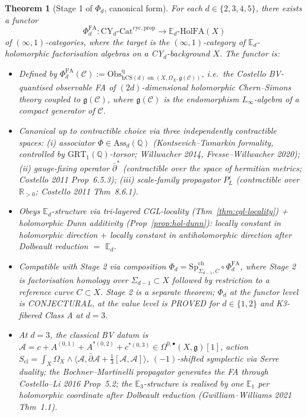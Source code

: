 \documentclass[11pt]{article}
\newtheorem{theorem}{Theorem}
\theoremstyle{definition}
\providecommand{\RR}{\mathbb{R}}
\providecommand{\QQ}{\mathbb{Q}}
\providecommand{\fg}{\mathfrak{g}}
\providecommand{\cA}{\mathcal{A}}
\providecommand{\cC}{\mathcal{C}}
\providecommand{\Obs}{\mathrm{Obs}}
\providecommand{\hCS}{\mathrm{hCS}}
\providecommand{\FA}{\mathrm{FA}}
\providecommand{\HolFA}{\mathrm{HolFA}}
\begin{document}
\begin{theorem}[Stage 1 of $\Phi_d$, canonical form]
\label{thm:stage1-canonical}
For each $d\in\{2,3,4,5\}$, there exists a functor
\[
  \Phi^{\FA}_d\colon \mathrm{CY}_d\text{-Cat}^{\mathrm{cyc},\mathrm{prop}}
  \longrightarrow \mathbb{E}_d\text{-}\HolFA(X)
\]
of $(\infty,1)$-categories, where the target is the
$(\infty,1)$-category of $\mathbb{E}_d$-holomorphic factorisation
algebras on a CY$_d$-background $X$. The functor is:
\begin{itemize}[leftmargin=2em]
  \item \emph{Defined} by
  $\Phi^{\FA}_d(\cC) := \Obs^{\mathrm{q}}_{\hCS(d)\text{ on }(X,\Omega_X,\fg(\cC))}$,
  i.e.\ the Costello BV-quantised observable FA of
  $(2d)$-dimensional holomorphic Chern--Simons theory coupled to
  $\fg(\cC)$, where $\fg(\cC)$ is the endomorphism $L_\infty$-algebra
  of a compact generator of $\cC$.
  \item \emph{Canonical up to contractible choice} via three
  independently contractible spaces: (i) associator
  $\Phi\in\mathrm{Ass}_d(\QQ)$ (Kontsevich--Tamarkin formality,
  controlled by $\mathrm{GRT}_1(\QQ)$-torsor; Willwacher 2014,
  Fresse--Willwacher 2020); (ii) gauge-fixing operator
  $\bar\partial^*$ (contractible over the space of hermitian
  metrics; Costello 2011 Prop~6.5.3); (iii) scale-family propagator
  $P_L^\varepsilon$ (contractible over $\RR_{>0}$; Costello 2011
  Thm~8.6.1).
  \item \emph{Obeys $\mathbb{E}_d$-structure} via tri-layered
  CGL-locality (Thm~\ref{thm:cgl-locality}) + holomorphic Dunn
  additivity (Prop~\ref{prop:hol-dunn}): locally constant in
  holomorphic direction $+$ locally constant in antiholomorphic
  direction after Dolbeault reduction $=$ $\mathbb{E}_d$.
  \item \emph{Compatible with Stage 2} via composition
  $\Phi_d = \mathrm{Sp}^{\mathrm{ch}}_{\Sigma_{d-1}, C}\circ
  \Phi^{\FA}_d$, where Stage 2 is factorisation homology over
  $\Sigma_{d-1}\subset X$ followed by restriction to a reference
  curve $C\subset X$. Stage 2 is a separate theorem;
  $\Phi_d$ at the functor level is CONJECTURAL, at the value level
  is PROVED for $d\in\{1,2\}$ and K3-fibered Class A at $d = 3$.
  \item At $d = 3$, the classical BV datum is
  $\cA = c + A^{(0,1)} + A^{*(0,2)} + c^{*(0,3)} \in
  \Omega^{0,\bullet}(X,\fg)[1]$, action
  $S_{\mathrm{cl}} = \int_X \Omega_X\wedge \langle\cA,
  \bar\partial\cA + \tfrac{1}{3}[\cA,\cA]\rangle$, $(-1)$-shifted
  symplectic via Serre duality; the Bochner--Martinelli propagator
  generates the FA through Costello--Li 2016 Prop~5.2; the
  $\mathbb{E}_3$-structure is realised by one $\mathbb{E}_1$ per
  holomorphic coordinate after Dolbeault reduction
  (Gwilliam--Williams 2021 Thm~1.1).
\end{itemize}
\end{theorem}
\end{document}
